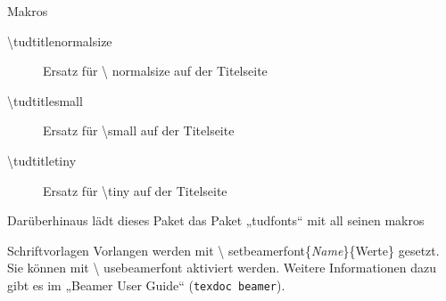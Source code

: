 \documentclass[presentation,t]{beamer}
\begin{document}
\begin{frame}[label=sec-2-4-2]{Makros}
\begin{description}
\item[{\textbackslash tudtitlenormalsize}] Ersatz für \textbackslash
  normalsize auf der Titelseite
\item[{\textbackslash tudtitlesmall}] Ersatz für \textbackslash small auf der Titelseite
\item[{\textbackslash tudtitletiny}] Ersatz für \textbackslash tiny auf der Titelseite
\end{description}

Darüberhinaus lädt dieses Paket das Paket „tudfonts“ mit all seinen makros
\end{frame}

\begin{frame}[label=sec-2-4-3]{Schriftvorlagen}
Vorlangen werden mit \textbackslash
setbeamerfont\{\emph{Name}\}\{Werte\} gesetzt. Sie können mit \textbackslash
usebeamerfont aktiviert werden. Weitere Informationen dazu gibt es im
„Beamer User Guide“ (\texttt{texdoc beamer}).


\end{frame}
\end{document}
